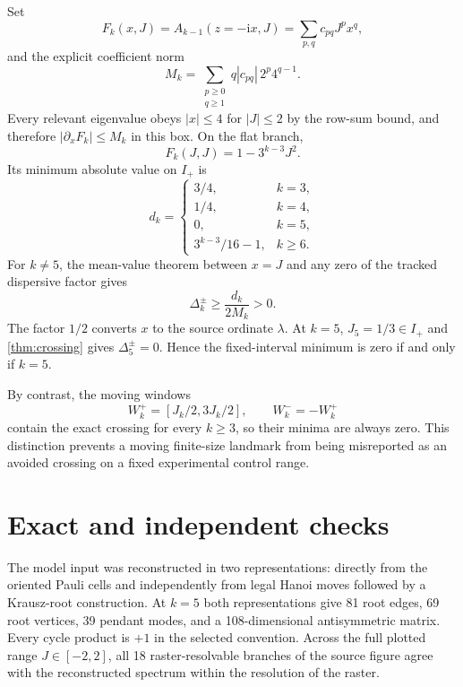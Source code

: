 \documentclass[11pt]{article}
\theoremstyle{remark}
\newcommand{\ii}{\mathrm{i}}
\begin{document}
Set
\begin{equation}
 F_k(x,J)=A_{k-1}(z=-\ii x,J)=\sum_{p,q}c_{pq}J^px^q,
 \label{eq:F-def}
\end{equation}
and the explicit coefficient norm
\begin{equation}
 M_k=\sum_{\substack{p\geq0\\q\geq1}}
 q|c_{pq}|\,2^p4^{q-1}.
 \label{eq:M-def}
\end{equation}
Every relevant eigenvalue obeys $|x|\leq4$ for $|J|\leq2$ by the row-sum
bound, and therefore $|\partial_xF_k|\leq M_k$ in this box.  On the flat
branch,
\begin{equation}
 F_k(J,J)=1-3^{k-3}J^2.
 \label{eq:F-flat}
\end{equation}
Its minimum absolute value on $I_+$ is
\begin{equation}
 d_k=
 \begin{cases}
 3/4,&k=3,\\
 1/4,&k=4,\\
 0,&k=5,\\
 3^{k-3}/16-1,&k\geq6.
 \end{cases}
 \label{eq:d-values}
\end{equation}
For $k\neq5$, the mean-value theorem between $x=J$ and any zero of the
tracked dispersive factor gives
\begin{equation}
 \boxed{\Delta_k^\pm\geq\frac{d_k}{2M_k}>0.}
 \label{eq:fixed-gap-bound}
\end{equation}
The factor $1/2$ converts $x$ to the source ordinate $\lambda$.  At $k=5$,
$J_5=1/3\in I_+$ and \cref{thm:crossing} gives
$\Delta_5^\pm=0$.  Hence the fixed-interval minimum is zero if and only if
$k=5$.

By contrast, the moving windows
\begin{equation}
 W_k^+=[J_k/2,3J_k/2],\qquad W_k^-=-W_k^+
 \label{eq:moving-windows}
\end{equation}
contain the exact crossing for every $k\geq3$, so their minima are always
zero.  This distinction prevents a moving finite-size landmark from being
misreported as an avoided crossing on a fixed experimental control range.

\section{Exact and independent checks}
\label{sec:checks}

The model input was reconstructed in two representations: directly from the
oriented Pauli cells and independently from legal Hanoi moves followed by a
Krausz-root construction.  At $k=5$ both representations give 81 root edges,
69 root vertices, 39 pendant modes, and a 108-dimensional antisymmetric
matrix.  Every cycle product is $+1$ in the selected convention.  Across the
full plotted range $J\in[-2,2]$, all 18 raster-resolvable branches of the
source figure agree with the reconstructed spectrum within the resolution of
the raster.
\end{document}
